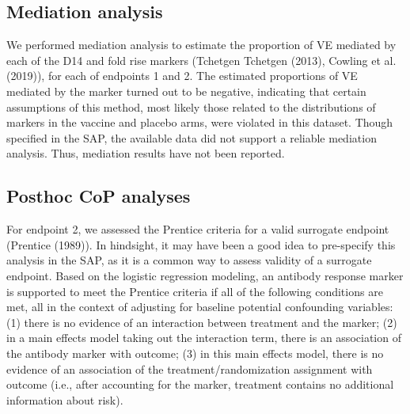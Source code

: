 \documentclass[11pt]{article}
\begin{document}

\clearpage

\hypertarget{mediation-analysis}{%
\subsection{Mediation analysis}\label{mediation-analysis}}

We performed mediation analysis to estimate the proportion of VE mediated by each of the D14 and fold rise markers (Tchetgen Tchetgen (2013), Cowling et al. (2019)), for each of endpoints 1 and 2. The estimated proportions of VE mediated by the marker turned out to be negative, indicating that certain assumptions of this method, most likely those related to the distributions of markers in the vaccine and placebo arms, were violated in this dataset. Though specified in the SAP, the available data did not support a reliable mediation analysis. Thus, mediation results have not been reported.

\clearpage

\hypertarget{posthoc-cop-analyses}{%
\subsection{Posthoc CoP analyses}\label{posthoc-cop-analyses}}

For endpoint 2, we assessed the Prentice criteria for a valid surrogate endpoint (Prentice (1989)). In hindsight, it may have been a good idea to pre-specify this analysis in the SAP, as it is a common way to assess validity of a surrogate endpoint. Based on the logistic regression modeling, an antibody response marker is supported to meet the Prentice criteria if all of the following conditions are met, all in the context of adjusting for baseline potential confounding variables:
(1) there is no evidence of an interaction between treatment and the marker; (2) in a main effects model taking out the interaction term, there is an association of the antibody marker with outcome; (3) in this main effects model, there is no evidence of an association of the treatment/randomization assignment with outcome (i.e., after accounting for the marker, treatment contains no additional information about risk).
\end{document}
